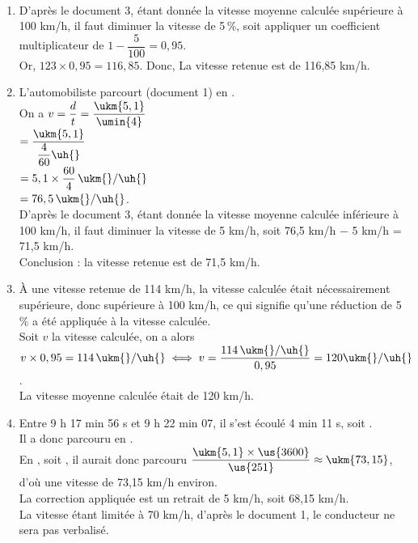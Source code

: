 \begin{corrige}
\ \\ [-5mm]
   \begin{enumerate}
      \item D'après le document 3, étant donnée la vitesse moyenne calculée supérieure à 100 km/h, il faut diminuer la vitesse de 5\,\%, soit appliquer un coefficient multiplicateur de $1-\dfrac{5}{100} =0,95$. \\ [1mm]
         Or, $123\times0,95 =116,85$. Donc, {\blue La vitesse retenue est de 116,85 km/h}.
      \item L'automobiliste parcourt  (document 1) en . \\ [1mm]
         On a $v =\dfrac{d}{t} =\dfrac{\ukm{5,1}}{\umin{4}}$ \\ [2mm]
         \hspace*{17mm} $=\dfrac{\ukm{5,1}}{\dfrac{4}{60}\uh{}}$ \\ [1mm]
         \hspace*{17mm} $=5,1\times\dfrac{60}{4}\,\ukm{}/\uh{}$ \\ [1mm]
         \hspace*{17mm} $=76,5\,\ukm{}/\uh{}$. \\ [1mm]
         D'après le document 3, étant donnée la vitesse moyenne calculée inférieure à 100 km/h, il faut diminuer la vitesse de 5 km/h, soit 76,5 km/h $-$ 5 km/h = 71,5 km/h. \\
         Conclusion : {\blue la vitesse retenue est de 71,5 km/h}.
      \item À une vitesse retenue de 114 km/h, la vitesse calculée était nécessairement supérieure, donc supérieure à 100 km/h, ce qui signifie qu'une réduction de 5\,\% a été appliquée à la vitesse calculée. \\ [1mm]
         Soit $v$ la vitesse calculée, on a alors $v\times0,95 =114\,\ukm{}/\uh{} \iff v =\dfrac{114\,\ukm{}/\uh{}}{0,95} =120\ukm{}/\uh{}$. \\
         {\blue La vitesse moyenne calculée était de 120 km/h}.
      \item Entre 9 h 17 min 56 s et 9 h 22 min 07, il s'est écoulé 4 min 11 s, soit . \\
         Il a donc parcouru  en . \\
         En , soit , il aurait donc parcouru $\dfrac{\ukm{5,1}\times\us{3600}}{\us{251}} \approx\ukm{73,15}$, d'où une vitesse de 73,15 km/h environ. \\
         La correction appliquée est un retrait de 5 km/h, soit 68,15 km/h. \\
         La vitesse étant limitée à 70 km/h, d'après le document 1, {\blue le conducteur ne sera pas verbalisé}.
   \end{enumerate}
\end{corrige}
   

